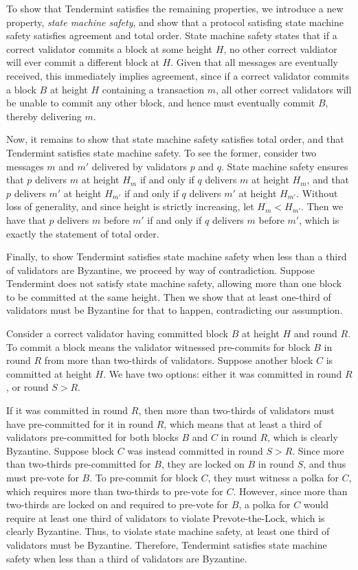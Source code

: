 To show that Tendermint satisfies the remaining properties,
we introduce a new property, \emph{state machine safety},
and show that a protocol satisfing state machine safety satisfies
agreement and total order.
State machine safety states that if a correct validator commits a block at some height $H$,
no other correct valdiator will ever commit a different block at $H$.
Given that all messages are eventually received, 
this immediately implies agreement, since if a correct validator commits a block $B$ at height $H$ 
containing a transaction $m$, all other correct validators will be unable to commit any other block,
and hence must eventually commit $B$, thereby delivering $m$.

Now, it remains to show that state machine safety satisfies total order,
and that Tendermint satisfies state machine safety.
To see the former, consider two messages $m$ and $m'$ delivered by validators $p$ and $q$.
State machine safety ensures that $p$ delivers $m$ at height $H_m$ if and only if
$q$ delivers $m$ at height $H_m$, and that $p$ delivers $m'$ at height $H_{m'}$ 
if and only if $q$ delivers $m'$ at height $H_{m'}$. 
Without loss of generality, and since height is strictly increasing, let $H_m < H_{m'}$.
Then we have that $p$ delivers $m$ before $m'$ if and only if $q$ delivers $m$ before $m'$,
which is exactly the statement of total order.

Finally, to show Tendermint satisfies state machine safety when less than a third of 
validators are Byzantine, we proceed by way of contradiction.
Suppose Tendermint does not satisfy state machine safety, 
allowing more than one block to be committed at the same height.
Then we show that at least one-third of validators must be Byzantine for that to happen,
contradicting our assumption.

Consider a correct validator having committed block $B$ at height $H$ and round $R$.
To commit a block means the validator witnessed pre-commits 
for block $B$ in round $R$ from more than two-thirds of validators.
Suppose another block $C$ is committed at height $H$. 
We have two options: either it was committed in round $R$, or round $S > R$.

If it was committed in round $R$, then more than two-thirds of validators
must have pre-committed for it in round $R$, which means that at least a third of validators 
pre-committed for both blocks $B$ and $C$ in round $R$, which is clearly Byzantine.
Suppose block $C$ was instead committed in round $S > R$.
Since more than two-thirds pre-committed for $B$, they are locked on $B$ in round $S$,
and thus must pre-vote for $B$. To pre-commit for block $C$, they must 
witness a polka for $C$, which requires more than two-thirds to pre-vote for $C$.
However, since more than two-thirds are locked on and required to pre-vote for $B$,
a polka for $C$ would require at least one third of validators to violate Prevote-the-Lock,
which is clearly Byzantine.
Thus, to violate state machine safety, at least one third of validators must be Byzantine.
Therefore, Tendermint satisfies state machine safety when less than a third of validators are Byzantine.

